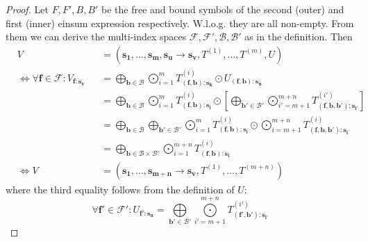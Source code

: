 \begin{proof}
    \small
    Let $F, F', B, B'$ be the free and bound symbols of the second (outer) and first (inner) einsum expression respectively.
    W.l.o.g. they are all non-empty.
    From them we can derive the multi-index spaces $\mathcal{F}, \mathcal{F}', \mathcal{B}, \mathcal{B}'$ as in the definition.
    Then
    \begin{align*}
         & V                                                         &  & = (\bm{s_1},\dots,\bm{s_m}, \bm{s_u} \rightarrow \bm{s_v}, T^{(1)},\dots,T^{(m)}, U)                                                                                                                                                                             \\
         & \iff \forall \bm{f} \in \mathcal{F}: V_{\bm{f}: \bm{s_v}} &  & = \bigoplus\limits_{\bm{b} \in \mathcal{B}} \bigodot\limits_{i = 1}^{m} T^{(i)}_{(\bm{f}, \bm{b}):\bm{s_k}} \odot U_{(\bm{f}, \bm{b}):\bm{s_u}}                                                                                                                  \\
         &                                                           &  & = \bigoplus\limits_{\bm{b} \in \mathcal{B}} \bigodot\limits_{i = 1}^{m} T^{(i)}_{(\bm{f}, \bm{b}):\bm{s_i}} \odot \left[\bigoplus\limits_{\bm{b'} \in \mathcal{B}'} \bigodot\limits_{i' = m + 1}^{m + n} T^{(i')}_{(\bm{f}, \bm{b}, \bm{b'}):\bm{s_{i'}}}\right] \\
         &                                                           &  & = \bigoplus\limits_{\bm{b} \in \mathcal{B}} \bigoplus\limits_{\bm{b'} \in \mathcal{B}'} \bigodot\limits_{i = 1}^{m} T^{(i)}_{(\bm{f}, \bm{b}):\bm{s_i}} \odot \bigodot\limits_{i = m + 1}^{m + n} T^{(i)}_{(\bm{f}, \bm{b}, \bm{b'}):\bm{s_{i}}}                 \\
         &                                                           &  & = \bigoplus\limits_{\bm{b} \in \mathcal{B} \times \mathcal{B}'} \bigodot\limits_{i = 1}^{m + n} T^{(i)}_{(\bm{f}, \bm{b}):\bm{s_i}}                                                                                                                              \\
         & \iff V                                                    &  & = (\bm{s_1}, \dots, \bm{s_{m + n}} \rightarrow \bm{s_v}, T^{(1)}, \dots, T^{(m + n)})
    \end{align*}
    where the third equality follows from the definition of $U$:
    $$\forall \bm{f'} \in \mathcal{F}': U_{\bm{f'}: \bm{s_u}} = \bigoplus\limits_{\bm{b'} \in \mathcal{B}'} \bigodot\limits_{i' = m + 1}^{m + n} T^{(i')}_{(\bm{f'}, \bm{b'}):\bm{s_{i'}}}$$

\end{proof}
